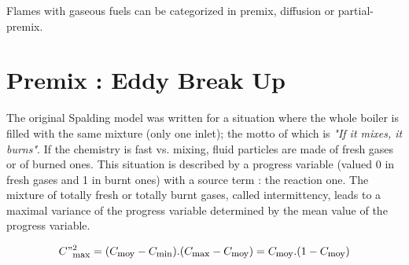 
%
%
%
%


  
Flames with gaseous fuels can be categorized in premix, diffusion or
partial-premix.

\section*{Premix : Eddy Break Up}
 
The original Spalding model \cite{1} was written for a situation where the whole
boiler is filled with the same mixture (only one inlet); the motto of which is
\textit{"If it mixes, it burns"}. If the chemistry is fast vs. mixing, fluid
particles are made of fresh gases or of burned ones. This situation is described
by a progress variable (valued 0 in fresh gases and 1 in burnt ones) with a
source term : the reaction one. The mixture of totally fresh or totally burnt
gases, called intermittency, leads to a maximal variance of the progress
variable determined by the mean value of the progress variable.
 
\begin{equation}
C"^{2}_{\mbox{\footnotesize max}} = (C_{\mbox{\footnotesize moy}} -C_{\mbox{\footnotesize min}}).(C_{\mbox{\footnotesize max}}-C_{\mbox{\footnotesize moy}}) = C_{\mbox{\footnotesize moy}} . (1-C_{\mbox{\footnotesize moy}})
\end{equation}

